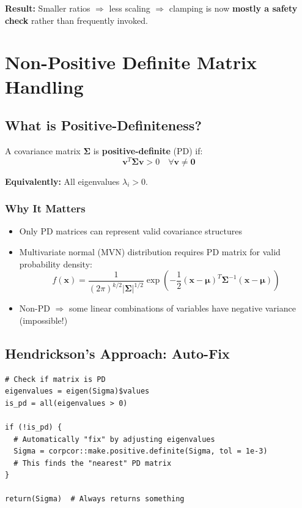 \documentclass[11pt]{article}
\begin{document}
\textbf{Result:} Smaller ratios $\Rightarrow$ less scaling $\Rightarrow$ clamping is now \textbf{mostly a safety check} rather than frequently invoked.

\section{Non-Positive Definite Matrix Handling}

\subsection{What is Positive-Definiteness?}

A covariance matrix $\boldsymbol{\Sigma}$ is \textbf{positive-definite} (PD) if:
\[
\mathbf{v}^T \boldsymbol{\Sigma} \mathbf{v} > 0 \quad \forall \mathbf{v} \neq \mathbf{0}
\]

\textbf{Equivalently:} All eigenvalues $\lambda_i > 0$.

\subsubsection{Why It Matters}

\begin{itemize}
    \item Only PD matrices can represent valid covariance structures
    \item Multivariate normal (MVN) distribution requires PD matrix for valid probability density:
    \[
    f(\mathbf{x}) = \frac{1}{(2\pi)^{k/2} |\boldsymbol{\Sigma}|^{1/2}} \exp\left(-\frac{1}{2}(\mathbf{x}-\boldsymbol{\mu})^T \boldsymbol{\Sigma}^{-1} (\mathbf{x}-\boldsymbol{\mu})\right)
    \]
    \item Non-PD $\Rightarrow$ some linear combinations of variables have negative variance (impossible!)
\end{itemize}

\subsection{Hendrickson's Approach: Auto-Fix}

\begin{lstlisting}[style=Rstyle]
# Check if matrix is PD
eigenvalues = eigen(Sigma)$values
is_pd = all(eigenvalues > 0)

if (!is_pd) {
  # Automatically "fix" by adjusting eigenvalues
  Sigma = corpcor::make.positive.definite(Sigma, tol = 1e-3)
  # This finds the "nearest" PD matrix
}

return(Sigma)  # Always returns something
\end{lstlisting}
\end{document}
